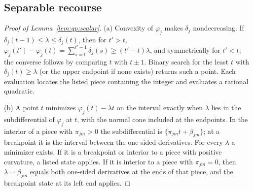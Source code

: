 \subsection{Separable recourse}\label{app:qp:sep}

\begin{proof}[Proof of Lemma~\ref{lem:qp:scalar}]
(a) Convexity of $\varphi_j$ makes $\delta_j$ nondecreasing. If
$\delta_j(t-1)\le\lambda\le\delta_j(t)$, then for $t'>t$,
$\varphi_j(t')-\varphi_j(t)=\sum_{s=t}^{t'-1}\delta_j(s)\ge(t'-t)\lambda$, and
symmetrically for $t'<t$; the converse follows by comparing $t$ with $t\pm1$.
Binary search for the least $t$ with $\delta_j(t)\ge\lambda$ (or the upper
endpoint if none exists) returns such a point. Each evaluation locates the
listed piece containing the integer and evaluates a rational quadratic.

(b) A point $t$ minimizes $\varphi_j(t)-\lambda t$ on the interval exactly
when $\lambda$ lies in the subdifferential of $\varphi_j$ at $t$, with the
normal cone included at the endpoints. In the interior of a piece with
$\pi_{jm}>0$ the subdifferential is $\{\pi_{jm}t+\beta_{jm}\}$; at a
breakpoint it is the interval between the one-sided derivatives. For every
$\lambda$ a minimizer exists. If it is a breakpoint or interior to a piece
with positive curvature, a listed state applies. If it is interior to a piece
with $\pi_{jm}=0$, then $\lambda=\beta_{jm}$ equals both one-sided derivatives at
the ends of that piece, and the breakpoint state at its left end applies.
\end{proof}

